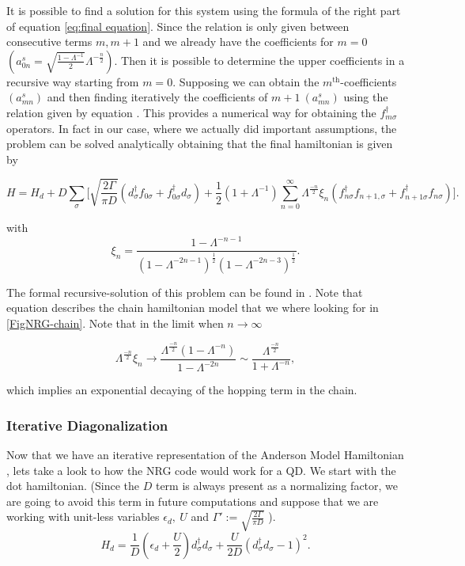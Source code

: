 It is possible to find a solution for this system using the formula of
the right part of equation \ref{eq:final equation}. Since the relation
is only given between consecutive terms $m,m+1$ and we already have
the coefficients for $m=0$ $\left(a_{0n}^{s}=\sqrt{\frac{1-\Lambda^{-1}}{2}}\Lambda^{-\frac{n}{2}}\right).$
Then it is possible to determine the upper coefficients in a recursive way starting
from $m=0$. Supposing we can obtain the $m^{\mbox{th}}$-coefficients
$(a_{mn}^{s})$ and then finding iteratively the coefficients of $m+1\ (a_{mn}^{s})$
using the relation given by equation .
This provides a numerical way for obtaining the $f_{m\sigma}^{\dagger}$
operators. In fact in our case, where we actually did important assumptions,
the problem can be solved analytically obtaining that the final hamiltonian
is given by 

\begin{equation}
H=H_{d}+D\sum_{\sigma}\Biggl[\sqrt{\frac{2\Gamma}{\pi D}}\left(d_{\sigma}^{\dagger}f_{0\sigma}+f_{0\sigma}^{\dagger}d_{\sigma}\right)+\frac{1}{2}\left(1+\Lambda^{-1}\right)\sum_{n=0}^{\infty}\Lambda^{\frac{-n}{2}}\xi_{n}\left(f_{n\sigma}^{\dagger}f_{n+1,\sigma}+f_{n+1\sigma}^{\dagger}f_{n\sigma}\right)\Biggr].\label{eq:chain-Hamiltonian}
\end{equation}


with 
\[
\xi_{n}=\frac{1-\Lambda^{-n-1}}{\left(1-\Lambda^{-2n-1}\right)^{\frac{1}{2}}\left(1-\Lambda^{-2n-3}\right)^{\frac{1}{2}}}.
\]


The formal recursive-solution of this problem can be found in \citep{bulla_numerical_2008}
. Note that equation  describes the
chain hamiltonian model that we where looking for in \ref{FigNRG-chain}.
Note that in the limit when $n\longrightarrow\infty$ 

\[
\Lambda^{\frac{-n}{2}}\xi_{n}\longrightarrow\frac{\Lambda^{\frac{-n}{2}}\left(1-\Lambda^{-n}\right)}{1-\Lambda^{-2n}}\sim\frac{\Lambda^{\frac{-n}{2}}}{1+\Lambda^{-n}},
\]


which implies an exponential decaying of the hopping term in the chain. 

\subsubsection{Iterative Diagonalization}

Now that we have an iterative representation of the Anderson Model
Hamiltonian , lets take a look to
how the NRG code would work for a QD. We start with the dot hamiltonian.
(Since the $D$ term is always present as a normalizing factor, we
are going to avoid this term in future computations and suppose that
we are working with unit-less variables $\epsilon_{d},\ U$ and $\Gamma':=\sqrt{\frac{2\Gamma}{\pi D}}$
).
\begin{equation}
H_{d}=\frac{1}{D}\left(\epsilon_{d}+\frac{U}{2}\right)d_{\sigma}^{\dagger}d_{\sigma}+\frac{U}{2D}(d_{\sigma}^{\dagger}d_{\sigma}-1)^{2}.\label{eq:DotHam}
\end{equation}


